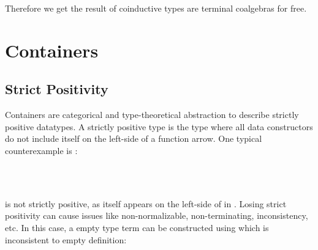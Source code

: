 Therefore we get the result of coinductive types are terminal coalgebras for free.

\section{Containers}

\subsection{Strict Positivity}

Containers are categorical and type-theoretical abstraction to describe strictly positive datatypes. A strictly positive type is the type where all data constructors do not include itself on the left-side of a function arrow. One typical counterexample is :

\begin{code}%
\>[0]\AgdaSymbol{\{-\#}\AgdaSpace{}%
\AgdaSpace{}%
\AgdaSymbol{\#-\}}\<%
\\
\>[0]\AgdaSpace{}%
\AgdaSpace{}%
\AgdaSymbol{:}\AgdaSpace{}%
\AgdaSpace{}%
\<%
\\
\>[0][@{}l@{\AgdaIndent{0}}]%
\>[2]\AgdaSpace{}%
\AgdaSymbol{:}\AgdaSpace{}%
\AgdaSymbol{(}\AgdaSpace{}%
\AgdaSpace{}%
\AgdaSymbol{)}\AgdaSpace{}%
\AgdaSpace{}%
\<%
\end{code}

 is not strictly positive, as  itself appears on the left-side of  in . Losing strict positivity can cause issues like non-normalizable, non-terminating, inconsistency, etc. In this case, a empty type term can be constructed using  which is inconsistent to empty definition:

\begin{code}%
\>[0]\AgdaSpace{}%
\AgdaSymbol{:}\AgdaSpace{}%
\AgdaSpace{}%
\AgdaSpace{}%
\<%
\\
\>[0]\AgdaSpace{}%
\AgdaSymbol{(}\AgdaSpace{}%
\AgdaSymbol{)}\AgdaSpace{}%
\AgdaSymbol{=}\AgdaSpace{}%
\AgdaSpace{}%
\AgdaSymbol{(}\AgdaSpace{}%
\AgdaSymbol{)}\<%
\\
%
\\[\AgdaEmptyExtraSkip]%
\>[0]\AgdaSpace{}%
\AgdaSymbol{:}\AgdaSpace{}%
\<%
\\
\>[0]\AgdaSpace{}%
\AgdaSymbol{=}\AgdaSpace{}%
\AgdaSpace{}%
\AgdaSymbol{(}\AgdaSpace{}%
\AgdaSymbol{)}\<%
\end{code}

